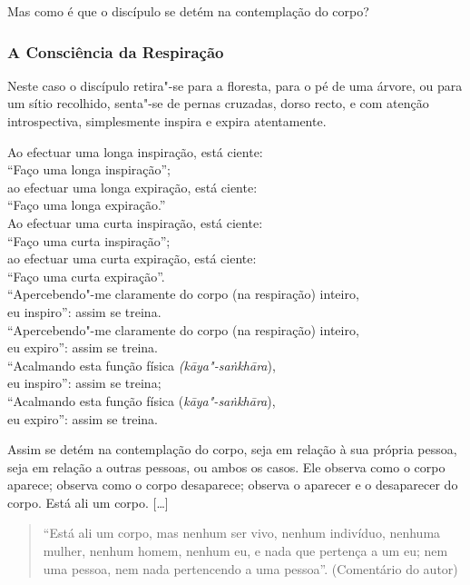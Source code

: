 
Mas como é que o discípulo se detém na contemplação do corpo?

\subsubsection{A Consciência da Respiração}


Neste caso o discípulo retira"-se para a floresta, para o pé de uma árvore, ou
para um sítio recolhido, senta"-se de pernas cruzadas, dorso recto, e com atenção
introspectiva, simplesmente inspira e expira atentamente.

Ao efectuar uma longa inspiração, está ciente:\\
“Faço uma longa inspiração”;\\
ao efectuar uma longa expiração, está ciente:\\
“Faço uma longa expiração.”\\
Ao efectuar uma curta inspiração, está ciente:\\
“Faço uma curta inspiração”;\\
ao efectuar uma curta expiração, está ciente:\\
“Faço uma curta expiração”.\\
“Apercebendo"-me claramente do corpo (na respiração) inteiro,\\
eu inspiro”: assim se treina.\\
“Apercebendo"-me claramente do corpo (na respiração) inteiro,\\
eu expiro”: assim se treina.\\
“Acalmando esta função física \emph{(kāya"-saṅkhāra}),\\
eu inspiro”: assim se treina;\\
“Acalmando esta função física (\emph{kāya"-saṅkhāra}),\\
eu expiro”: assim se treina.

Assim se detém na contemplação do corpo, seja em relação à sua própria pessoa,
seja em relação a outras pessoas, ou ambos os casos. Ele observa como o corpo
aparece; observa como o corpo desaparece; observa o aparecer e o desaparecer do
corpo. Está ali um corpo. [\ldots]

\begin{quote}
  “Está ali um corpo, mas nenhum ser vivo, nenhum indivíduo, nenhuma mulher,
  nenhum homem, nenhum eu, e nada que pertença a um eu; nem uma pessoa, nem nada
  pertencendo a uma pessoa”. (Comentário do autor)
\end{quote}

